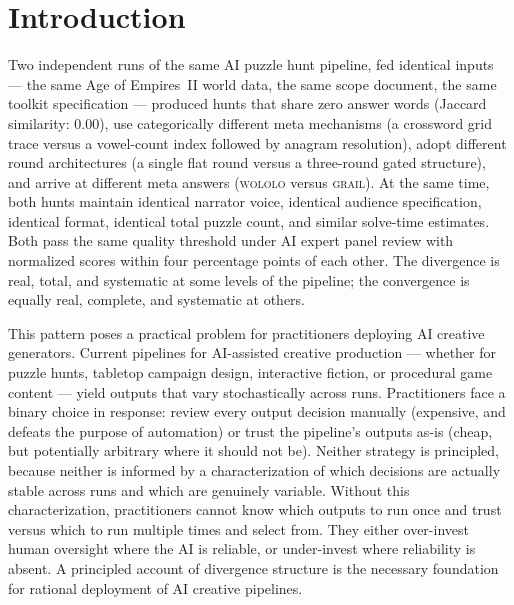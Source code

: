 \section{Introduction}

Two independent runs of the same AI puzzle hunt pipeline, fed identical inputs --- the same Age of Empires~II world data, the same scope document, the same toolkit specification --- produced hunts that share zero answer words (Jaccard similarity: 0.00), use categorically different meta mechanisms (a crossword grid trace versus a vowel-count index followed by anagram resolution), adopt different round architectures (a single flat round versus a three-round gated structure), and arrive at different meta answers (\textsc{wololo} versus \textsc{grail}). At the same time, both hunts maintain identical narrator voice, identical audience specification, identical format, identical total puzzle count, and similar solve-time estimates. Both pass the same quality threshold under AI expert panel review with normalized scores within four percentage points of each other. The divergence is real, total, and systematic at some levels of the pipeline; the convergence is equally real, complete, and systematic at others.

This pattern poses a practical problem for practitioners deploying AI creative generators. Current pipelines for AI-assisted creative production --- whether for puzzle hunts, tabletop campaign design, interactive fiction, or procedural game content --- yield outputs that vary stochastically across runs. Practitioners face a binary choice in response: review every output decision manually (expensive, and defeats the purpose of automation) or trust the pipeline's outputs as-is (cheap, but potentially arbitrary where it should not be). Neither strategy is principled, because neither is informed by a characterization of which decisions are actually stable across runs and which are genuinely variable. Without this characterization, practitioners cannot know which outputs to run once and trust versus which to run multiple times and select from. They either over-invest human oversight where the AI is reliable, or under-invest where reliability is absent. A principled account of divergence structure is the necessary foundation for rational deployment of AI creative pipelines.

